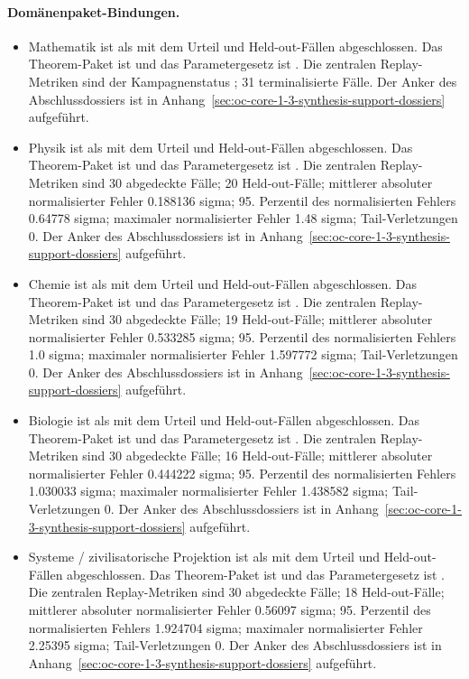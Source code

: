 \paragraph{Domänenpaket-Bindungen.}
\begin{itemize}[leftmargin=1.6em,nosep]
\item Mathematik ist als  mit dem Urteil  und  Held-out-Fällen abgeschlossen. Das Theorem-Paket ist  und das Parametergesetz ist . Die zentralen Replay-Metriken sind der Kampagnenstatus ; 31 terminalisierte Fälle. Der Anker des Abschlussdossiers ist in Anhang~\ref{sec:oc-core-1-3-synthesis-support-dossiers} aufgeführt.
\item Physik ist als  mit dem Urteil  und  Held-out-Fällen abgeschlossen. Das Theorem-Paket ist  und das Parametergesetz ist . Die zentralen Replay-Metriken sind 30 abgedeckte Fälle; 20 Held-out-Fälle; mittlerer absoluter normalisierter Fehler 0.188136 sigma; 95. Perzentil des normalisierten Fehlers 0.64778 sigma; maximaler normalisierter Fehler 1.48 sigma; Tail-Verletzungen 0. Der Anker des Abschlussdossiers ist in Anhang~\ref{sec:oc-core-1-3-synthesis-support-dossiers} aufgeführt.
\item Chemie ist als  mit dem Urteil  und  Held-out-Fällen abgeschlossen. Das Theorem-Paket ist  und das Parametergesetz ist . Die zentralen Replay-Metriken sind 30 abgedeckte Fälle; 19 Held-out-Fälle; mittlerer absoluter normalisierter Fehler 0.533285 sigma; 95. Perzentil des normalisierten Fehlers 1.0 sigma; maximaler normalisierter Fehler 1.597772 sigma; Tail-Verletzungen 0. Der Anker des Abschlussdossiers ist in Anhang~\ref{sec:oc-core-1-3-synthesis-support-dossiers} aufgeführt.
\item Biologie ist als  mit dem Urteil  und  Held-out-Fällen abgeschlossen. Das Theorem-Paket ist  und das Parametergesetz ist . Die zentralen Replay-Metriken sind 30 abgedeckte Fälle; 16 Held-out-Fälle; mittlerer absoluter normalisierter Fehler 0.444222 sigma; 95. Perzentil des normalisierten Fehlers 1.030033 sigma; maximaler normalisierter Fehler 1.438582 sigma; Tail-Verletzungen 0. Der Anker des Abschlussdossiers ist in Anhang~\ref{sec:oc-core-1-3-synthesis-support-dossiers} aufgeführt.
\item Systeme / zivilisatorische Projektion ist als  mit dem Urteil  und  Held-out-Fällen abgeschlossen. Das Theorem-Paket ist  und das Parametergesetz ist . Die zentralen Replay-Metriken sind 30 abgedeckte Fälle; 18 Held-out-Fälle; mittlerer absoluter normalisierter Fehler 0.56097 sigma; 95. Perzentil des normalisierten Fehlers 1.924704 sigma; maximaler normalisierter Fehler 2.25395 sigma; Tail-Verletzungen 0. Der Anker des Abschlussdossiers ist in Anhang~\ref{sec:oc-core-1-3-synthesis-support-dossiers} aufgeführt.

\end{itemize}
